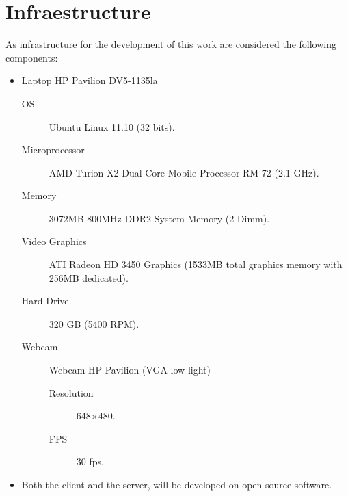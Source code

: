 \documentclass[12pt,letterpaper,titlepage]{article}
\begin{document}
\section{Infraestructure}
As infrastructure for the development of this work are considered the following components:
\begin{itemize}
\item Laptop HP Pavilion DV5-1135la
	\begin{description}
	\item[OS] Ubuntu Linux 11.10 (32 bits).
	\item[Microprocessor] AMD Turion X2 Dual-Core Mobile Processor RM-72 (2.1 GHz).
	\item[Memory] 3072MB 800MHz DDR2 System Memory (2 Dimm).
	\item[Video Graphics] ATI Radeon HD 3450 Graphics (1533MB total graphics memory with 256MB dedicated).
	\item[Hard Drive] 320 GB (5400 RPM).
	\item[Webcam] Webcam HP Pavilion (VGA low-light)
		\begin{description}
		\item[Resolution] 648$\times$480.
		\item[FPS] 30 fps.
		\end{description}
	\end{description}
\item Both the client and the server, will be developed on open source software.
\end{itemize}
\clearpage

%

\end{document}
